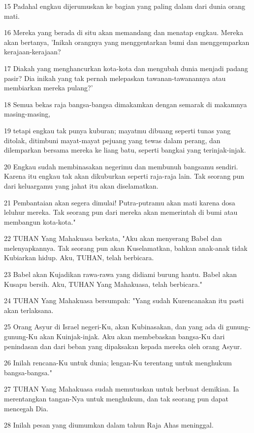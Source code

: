 \par 15 Padahal engkau dijerumuskan ke bagian yang paling dalam dari dunia orang mati.
\par 16 Mereka yang berada di situ akan memandang dan menatap engkau. Mereka akan bertanya, 'Inikah orangnya yang menggentarkan bumi dan menggemparkan kerajaan-kerajaan?
\par 17 Diakah yang menghancurkan kota-kota dan mengubah dunia menjadi padang pasir? Dia inikah yang tak pernah melepaskan tawanan-tawanannya atau membiarkan mereka pulang?'
\par 18 Semua bekas raja bangsa-bangsa dimakamkan dengan semarak di makamnya masing-masing,
\par 19 tetapi engkau tak punya kuburan; mayatmu dibuang seperti tunas yang ditolak, ditimbuni mayat-mayat pejuang yang tewas dalam perang, dan dilemparkan bersama mereka ke liang batu, seperti bangkai yang terinjak-injak.
\par 20 Engkau sudah membinasakan negerimu dan membunuh bangsamu sendiri. Karena itu engkau tak akan dikuburkan seperti raja-raja lain. Tak seorang pun dari keluargamu yang jahat itu akan diselamatkan.
\par 21 Pembantaian akan segera dimulai! Putra-putramu akan mati karena dosa leluhur mereka. Tak seorang pun dari mereka akan memerintah di bumi atau membangun kota-kota."
\par 22 TUHAN Yang Mahakuasa berkata, "Aku akan menyerang Babel dan melenyapkannya. Tak seorang pun akan Kuselamatkan, bahkan anak-anak tidak Kubiarkan hidup. Aku, TUHAN, telah berbicara.
\par 23 Babel akan Kujadikan rawa-rawa yang didiami burung hantu. Babel akan Kusapu bersih. Aku, TUHAN Yang Mahakuasa, telah berbicara."
\par 24 TUHAN Yang Mahakuasa bersumpah: "Yang sudah Kurencanakan itu pasti akan terlaksana.
\par 25 Orang Asyur di Israel negeri-Ku, akan Kubinasakan, dan yang ada di gunung-gunung-Ku akan Kuinjak-injak. Aku akan membebaskan bangsa-Ku dari penindasan dan dari beban yang dipaksakan kepada mereka oleh orang Asyur.
\par 26 Inilah rencana-Ku untuk dunia; lengan-Ku terentang untuk menghukum bangsa-bangsa."
\par 27 TUHAN Yang Mahakuasa sudah memutuskan untuk berbuat demikian. Ia merentangkan tangan-Nya untuk menghukum, dan tak seorang pun dapat mencegah Dia.
\par 28 Inilah pesan yang diumumkan dalam tahun Raja Ahas meninggal.
